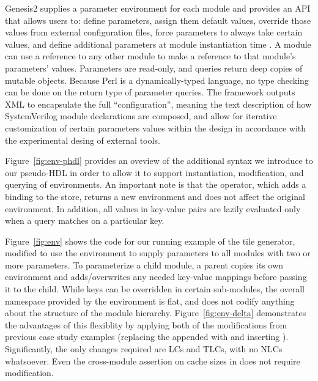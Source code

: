 Genesis2 supplies a parameter environment for each module and provides an API that allows users to:
define parameters,
assign them default values,
override those values from external configuration files,
force parameters to always take certain values,
and
define additional parameters at module instantiation time
\cite{shacham2011chip}.
A module can use a reference to any other module to make a reference to that module's parameters' values. 
Parameters are read-only, and queries return deep copies of mutable objects.
Because Perl is a dynamically-typed language, no type checking can be done on the return type of parameter queries.
The framework outputs XML to encapsulate the full ``configuration'', meaning the text description of how SystemVerilog module declarations are composed,
and allow for iterative customization of certain parameters values within the design in accordance with the experimental desing of external tools.

Figure~\ref{fig:env-phdl} provides an oveview of the additional syntax we introduce to our pseudo-HDL in order to allow it to support instantiation, modification, and querying of environments.
An important note is that the \code{++} operator, which adds a binding to the store, returns a new environment and does not affect the original environment.
In addition, all values in key-value pairs are lazily evaluated only when a query matches on a particular key.

Figure~\ref{fig:env} shows the code for our running example of the tile generator, modified to use the environment to supply parameters to all modules with two or more parameters.
To parameterize a child module, a parent copies its own environment and adds/overwrites any needed key-value mappings before passing it to the child.
While keys can be overridden in certain sub-modules, the overall namespace provided by the environment is flat, and does not codify anything about the structure of the module hierarchy.
Figure~\ref{fig:env-delta} demonstrates the advantages of this flexiblity by applying both of the modifications from previous case study examples
(replacing the appended  with  and inserting ).
Significantly, the only changes required are LCs and TLCs, with no NLCs whatsoever.
Even the cross-module assertion on cache sizes in  does not require modification.

